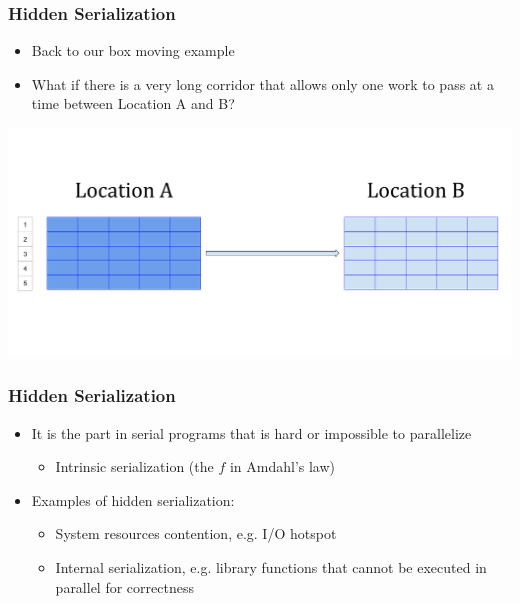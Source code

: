\documentclass[10pt,t]{beamer}
\begin{document}
\begin{frame}
  \frametitle{Hidden Serialization}
  \begin{itemize}
  \item Back to our box moving example
  \item What if there is a very long corridor that allows only one work to pass at a time between Location A and B?
  \end{itemize}
  \includegraphics[width=\textwidth]{./Parallel_Load}
\end{frame}

\begin{frame}
  \frametitle{Hidden Serialization}
  \begin{itemize}
  \item It is the part in serial programs that is hard or impossible to parallelize
    \begin{itemize}
    \item Intrinsic serialization (the $f$ in Amdahl's law)
    \end{itemize}
  \item Examples of hidden serialization:
    \begin{itemize}
    \item System resources contention, e.g. I/O hotspot
    \item Internal serialization, e.g. library functions that cannot be executed in parallel for correctness
    \end{itemize}
  \end{itemize}
\end{frame}
\end{document}
